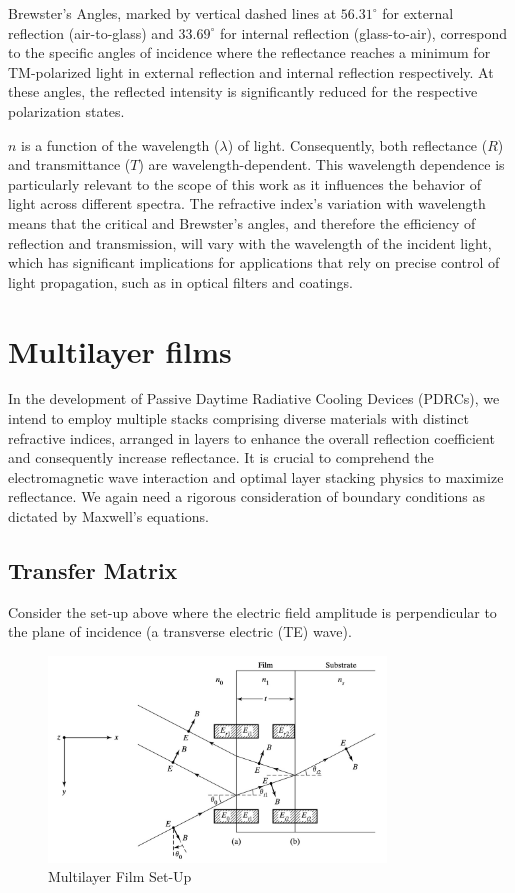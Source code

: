 Brewster's Angles, marked by vertical dashed lines at \(56.31^\circ\) for external reflection (air-to-glass) and \(33.69^\circ\) for internal reflection (glass-to-air), correspond to the specific angles of incidence where the reflectance reaches a minimum for TM-polarized light in external reflection and internal reflection respectively. At these angles, the reflected intensity is significantly reduced for the respective polarization states.

$n$ is a function of the wavelength ($\lambda$) of light. Consequently, both reflectance ($R$) and transmittance ($T$) are wavelength-dependent. This wavelength dependence is particularly relevant to the scope of this work as it influences the behavior of light across different spectra. The refractive index’s variation with wavelength means that the critical and Brewster's angles, and therefore the efficiency of reflection and transmission, will vary with the wavelength of the incident light, which has significant implications for applications that rely on precise control of light propagation, such as in optical filters and coatings.

\section{Multilayer films}
In the development of Passive Daytime Radiative Cooling Devices (PDRCs), we intend to employ multiple stacks comprising diverse materials with distinct refractive indices, arranged in layers to enhance the overall reflection coefficient and consequently increase reflectance. It is crucial to comprehend the electromagnetic wave interaction and optimal layer stacking physics to maximize reflectance. We again need a rigorous consideration of boundary conditions as dictated by Maxwell's equations.

\subsection{Transfer Matrix}
Consider the set-up above where the electric field amplitude is perpendicular to the plane of incidence (a transverse electric (TE) wave).

\begin{figure}
  \centering
  \includegraphics[width=0.8\textwidth]{Chapters/Figures/Multilayer Film Set-Up.jpeg}
  \caption{Multilayer Film Set-Up}
\end{figure}

